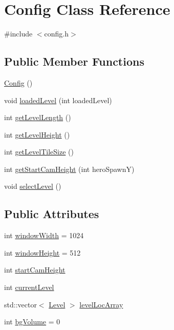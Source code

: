 \hypertarget{class_config}{}\section{Config Class Reference}
\label{class_config}


{\ttfamily \#include $<$config.\+h$>$}

\subsection*{Public Member Functions}
\begin{DoxyCompactItemize}
\item 
\hyperlink{class_config_abd0c571c116924871e30444b192b792a}{Config} ()
\item 
void \hyperlink{class_config_adb67a5a4c628bbf6685ca98008dda8ba}{loaded\+Level} (int loaded\+Level)
\item 
int \hyperlink{class_config_a9f8a9d18f378ae05cc2c0d34a659197b}{get\+Level\+Length} ()
\item 
int \hyperlink{class_config_abfef8420da803d9d53af5eca645107f9}{get\+Level\+Height} ()
\item 
int \hyperlink{class_config_a89ab75acd03f4f6c051941e0c3e1f35d}{get\+Level\+Tile\+Size} ()
\item 
int \hyperlink{class_config_aba1369c97001523c4206a47da0ce1361}{get\+Start\+Cam\+Height} (int hero\+SpawnY)
\item 
void \hyperlink{class_config_a6e411798bbb35067fbd09a73ea6d0eda}{select\+Level} ()
\end{DoxyCompactItemize}
\subsection*{Public Attributes}
\begin{DoxyCompactItemize}
\item 
int \hyperlink{class_config_a7b934416c53da81368fd7f800c2ae2c8}{window\+Width} = 1024
\item 
int \hyperlink{class_config_a88bb54f15c2bd07b9d8b65d45d5c6997}{window\+Height} = 512
\item 
int \hyperlink{class_config_a191a4461e0889485ae73f696cd3dfd3d}{start\+Cam\+Height}
\item 
int \hyperlink{class_config_ad8469bc162d05e0d33da9599ba22ad1c}{current\+Level}
\item 
std\+::vector$<$ \hyperlink{class_level}{Level} $>$ \hyperlink{class_config_a5aaeed24d7b392df4a548ce24d2be7d6}{level\+Loc\+Array}
\item 
int \hyperlink{class_config_a816300710638d02dc3c677920d7dd8af}{bg\+Volume} = 0
\end{DoxyCompactItemize}


